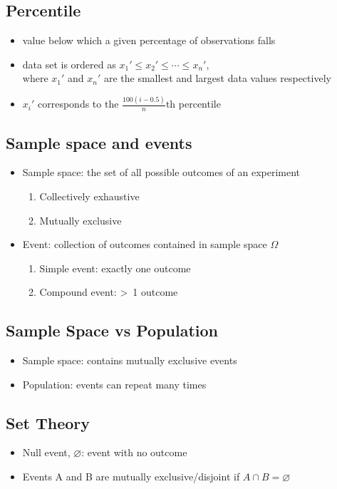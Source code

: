 \documentclass[a4paper]{article}
\begin{document}
\subsection{Percentile}
\begin{itemize}
    \item value below which a given percentage of observations falls
    \item data set is ordered as $x_{1}' \leq x_{2}'\leq \cdots \leq x_{n}'$,\\ where $x_{1}'$ and $x_{n}'$ are the smallest and largest data values respectively
    \item $x_{i}'$ corresponds to the $\frac{100(i-0.5)}{n}$th percentile
\end{itemize}
\subsection{Sample space and events}
\begin{itemize}
    \item Sample space: the set of all possible outcomes of an experiment
    \begin{enumerate}
        \item Collectively exhaustive
        \item Mutually exclusive
    \end{enumerate}
    \item Event: collection of outcomes contained in sample space $\Omega$
    \begin{enumerate}
        \item Simple event: exactly one outcome
        \item Compound event: \textgreater \ 1 outcome
    \end{enumerate}
\end{itemize}
\subsection{Sample Space vs Population}
\begin{itemize}
    \item Sample space: contains mutually exclusive events
    \item Population: events can repeat many times
\end{itemize}
\subsection{Set Theory}
\begin{itemize}
    \item Null event, $\varnothing$: event with no outcome
    \item Events A and B are mutually exclusive/disjoint if $A\cap B = \varnothing$
\end{itemize}
\end{document}
